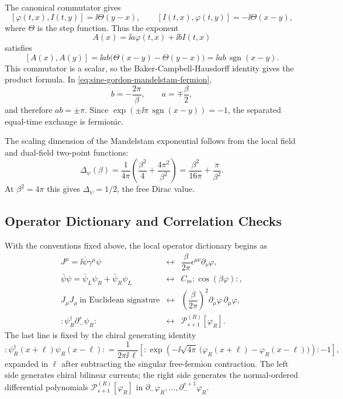 The canonical commutator gives
\[
  [\varphi(t,x),I(t,y)]=\ii\Theta(y-x),
  \qquad
  [I(t,x),\varphi(t,y)]=-\ii\Theta(x-y),
\]
where \(\Theta\) is the step function.  Thus the exponent
\[
  A(x)=\ii a\varphi(t,x)+\ii bI(t,x)
\]
satisfies
\[
  [A(x),A(y)]
  =
  \ii ab\bigl(\Theta(x-y)-\Theta(y-x)\bigr)
  =
  \ii ab\,\operatorname{sgn}(x-y).
\]
This commutator is a scalar, so the Baker-Campbell-Hausdorff identity gives
the product formula.  In
\eqref{eq:sine-gordon-mandelstam-fermion},
\[
  b=-\frac{2\pi}{\beta},
  \qquad
  a=\mp\frac{\beta}{2},
\]
and therefore \(ab=\pm\pi\).  Since
\(\exp(\pm\ii\pi\,\operatorname{sgn}(x-y))=-1\), the separated equal-time
exchange is fermionic.

The scaling dimension of the Mandelstam exponential follows from the local
field and dual-field two-point functions:
\begin{equation}
  \Delta_\psi(\beta)
  =
  \frac1{4\pi}
  \left(\frac{\beta^2}{4}+\frac{4\pi^2}{\beta^2}\right)
  =
  \frac{\beta^2}{16\pi}+\frac{\pi}{\beta^2}.
  \label{eq:sg-thirring-fermion-dimension}
\end{equation}
At \(\beta^2=4\pi\) this gives \(\Delta_\psi=1/2\), the free Dirac value.

\subsection{Operator Dictionary and Correlation Checks}

With the conventions fixed above, the local operator dictionary begins as
\begin{equation}
\begin{array}{ccl}
  J^\mu=\ii\bar\psi\gamma^\mu\psi
  &\longleftrightarrow&
  \dfrac{\beta}{2\pi}\epsilon^{\mu\nu}\partial_\nu\varphi,
  \\[1.1em]
  \bar\psi\psi=\bar\psi_L\psi_R+\bar\psi_R\psi_L
  &\longleftrightarrow&
  C_m:\!\cos(\beta\varphi)\!:,
  \\[1.1em]
  J_\mu J_\mu\ \text{in Euclidean signature}
  &\longleftrightarrow&
  \left(\dfrac{\beta}{2\pi}\right)^2
  \partial_\mu\varphi\,\partial_\mu\varphi,
  \\[1.1em]
  :\!\psi_R^\dagger\partial_-^s\psi_R\!:
  &\longleftrightarrow&
  \mathcal P_{s+1}^{(R)}[\varphi_R] .
\end{array}
\label{eq:sg-thirring-operator-dictionary}
\end{equation}
The last line is fixed by the chiral generating identity
\begin{equation}
  :\!\psi_R^\dagger(x+\ell)\psi_R(x-\ell)\!:
  =
  \frac{1}{2\pi\ii\,\ell}
  \left[
    :\!\exp\!\left(
      -\ii\sqrt{4\pi}\,
      \bigl(\varphi_R(x+\ell)-\varphi_R(x-\ell)\bigr)
    \right)\!:
    -1
  \right],
  \label{eq:sg-thirring-higher-spin-generating}
\end{equation}
expanded in \(\ell\) after subtracting the singular free-fermion contraction.
The left side generates chiral bilinear currents; the right side generates
the normal-ordered differential polynomials
\(\mathcal P_{s+1}^{(R)}[\varphi_R]\) in
\(\partial_-\varphi_R,\ldots,\partial_-^{s+1}\varphi_R\).

